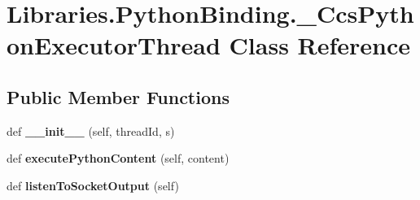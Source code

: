 \hypertarget{class_libraries_1_1_python_binding_1_1___ccs_python_executor_thread}{}\section{Libraries.\+Python\+Binding.\+\_\+\+Ccs\+Python\+Executor\+Thread Class Reference}
\label{class_libraries_1_1_python_binding_1_1___ccs_python_executor_thread}
\subsection*{Public Member Functions}
\begin{DoxyCompactItemize}
\item 
def {\bfseries \+\_\+\+\_\+init\+\_\+\+\_\+} (self, thread\+Id, s)\hypertarget{class_libraries_1_1_python_binding_1_1___ccs_python_executor_thread_ab49a692018fcff14536f7462640fcc8b}{}\label{class_libraries_1_1_python_binding_1_1___ccs_python_executor_thread_ab49a692018fcff14536f7462640fcc8b}

\item 
def {\bfseries execute\+Python\+Content} (self, content)\hypertarget{class_libraries_1_1_python_binding_1_1___ccs_python_executor_thread_a358495ad3da211dbdcc461837e10de7e}{}\label{class_libraries_1_1_python_binding_1_1___ccs_python_executor_thread_a358495ad3da211dbdcc461837e10de7e}

\item 
def {\bfseries listen\+To\+Socket\+Output} (self)\hypertarget{class_libraries_1_1_python_binding_1_1___ccs_python_executor_thread_abbcf559cfcd7a64a5bfe5b16c6060f18}{}\label{class_libraries_1_1_python_binding_1_1___ccs_python_executor_thread_abbcf559cfcd7a64a5bfe5b16c6060f18}

\end{DoxyCompactItemize}
